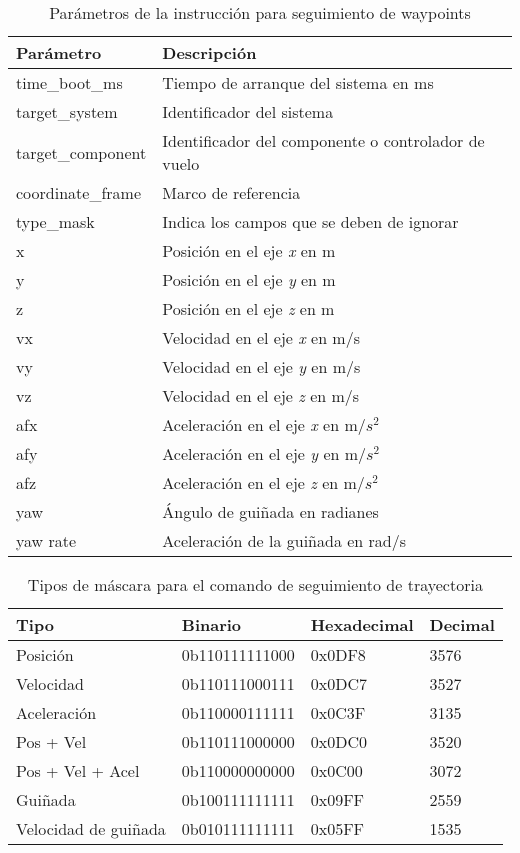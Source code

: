 \begin{table}[ht]
    \centering
    \begin{tabular}{||l|l||}
        \hline
        Parámetro & Descripción\\
        \hline
        time\_boot\_ms & Tiempo de arranque del sistema en ms\\
        target\_system & Identificador del sistema\\
        target\_component & Identificador del componente o controlador de vuelo\\
        coordinate\_frame & Marco de referencia\\
        type\_mask & Indica los campos que se deben de ignorar\\
        x & Posición en el eje \textit{x} en m\\
        y & Posición en el eje \textit{y} en m\\
        z & Posición en el eje \textit{z} en m\\
        vx & Velocidad en el eje \textit{x} en m/s\\
        vy & Velocidad en el eje \textit{y} en m/s\\
        vz & Velocidad en el eje \textit{z} en m/s\\
        afx & Aceleración en el eje \textit{x} en m/$s^2$\\
        afy & Aceleración en el eje \textit{y} en m/$s^2$\\
        afz & Aceleración en el eje \textit{z} en m/$s^2$\\
        yaw & Ángulo de guiñada en radianes\\
        yaw rate & Aceleración de la guiñada en rad/s\\
        \hline
    \end{tabular}
    \caption{Parámetros de la instrucción para seguimiento de waypoints}
    \label{tab:waypoint}
\end{table}

\begin{table}[ht]
    \centering
    \begin{tabular}{||l|l|l|l||}
        \hline
        Tipo & Binario & Hexadecimal & Decimal\\
        \hline
        Posición & 0b110111111000 & 0x0DF8  & 3576 \\
        Velocidad & 0b110111000111 & 0x0DC7  & 3527\\
        Aceleración & 0b110000111111 & 0x0C3F & 3135 \\
        Pos + Vel & 0b110111000000 & 0x0DC0 & 3520\\  
        Pos + Vel + Acel & 0b110000000000 & 0x0C00 & 3072\\
        Guiñada & 0b100111111111 &  0x09FF & 2559\\
        Velocidad de  guiñada& 0b010111111111  & 0x05FF & 1535\\
        \hline
    \end{tabular}
    \caption{Tipos de máscara para el comando de seguimiento de trayectoria}
    \label{tab:waypoint_mask}
\end{table}

